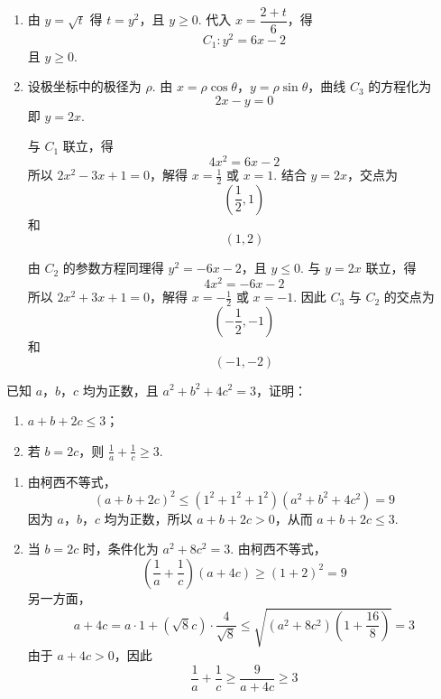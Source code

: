 \begin{solution}
\begin{enumerate}
\item 由 \(y=\sqrt t\) 得 \(t=y^2\)，且 \(y\ge0\). 代入 \(x=\dfrac{2+t}{6}\)，得
\[
C_1:y^2=6x-2
\]
且 \(y\ge0\).
\item 设极坐标中的极径为 \(\rho\). 由 \(x=\rho\cos\theta\)，\(y=\rho\sin\theta\)，曲线 \(C_3\) 的方程化为
\[
2x-y=0
\]
即 \(y=2x\).

与 \(C_1\) 联立，得
\[
4x^2=6x-2
\]
所以 \(2x^2-3x+1=0\)，解得 \(x=\frac12\) 或 \(x=1\). 结合 \(y=2x\)，交点为
\[
\left(\frac12,1\right)
\]
和
\[
(1,2)
\]

由 \(C_2\) 的参数方程同理得 \(y^2=-6x-2\)，且 \(y\le0\). 与 \(y=2x\) 联立，得
\[
4x^2=-6x-2
\]
所以 \(2x^2+3x+1=0\)，解得 \(x=-\frac12\) 或 \(x=-1\). 因此 \(C_3\) 与 \(C_2\) 的交点为
\[
\left(-\frac12,-1\right)
\]
和
\[
(-1,-2)
\]
\end{enumerate}
\end{solution}

\begin{problem}
已知 \(a\)，\(b\)，\(c\) 均为正数，且 \(a^2+b^2+4c^2=3\)，证明：

\begin{enumerate}
\item \(a+b+2c\le 3\)；
\item 若 \(b=2c\)，则 \(\frac1a+\frac1c\ge 3\).
\end{enumerate}
\end{problem}

\begin{solution}
\begin{enumerate}
\item 由柯西不等式，
\[
(a+b+2c)^2\le(1^2+1^2+1^2)(a^2+b^2+4c^2)=9
\]
因为 \(a\)，\(b\)，\(c\) 均为正数，所以 \(a+b+2c>0\)，从而 \(a+b+2c\le3\).
\item 当 \(b=2c\) 时，条件化为 \(a^2+8c^2=3\). 由柯西不等式，
\[
\left(\frac1a+\frac1c\right)(a+4c)\ge(1+2)^2=9
\]
另一方面，
\[
a+4c=a\cdot1+(\sqrt8c)\cdot\frac4{\sqrt8}\le\sqrt{(a^2+8c^2)\left(1+\frac{16}{8}\right)}=3
\]
由于 \(a+4c>0\)，因此
\[
\frac1a+\frac1c\ge\frac9{a+4c}\ge3
\]
\end{enumerate}
\end{solution}
